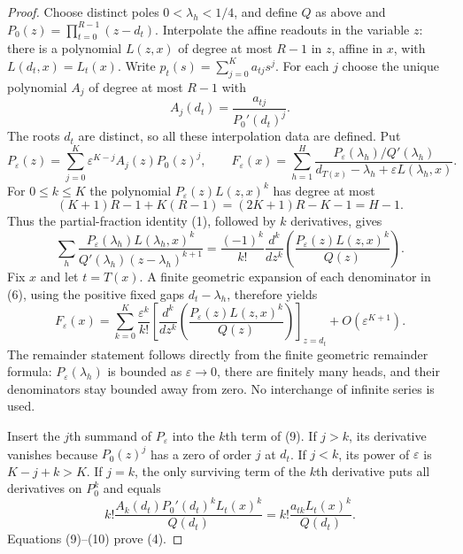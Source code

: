 \documentclass[11pt]{article}
\begin{document}
\begin{proof}
Choose distinct poles $0<\lambda_h<1/4$, and define $Q$ as above and
$P_0(z)=\prod_{t=0}^{R-1}(z-d_t)$. Interpolate the affine readouts in
the variable $z$: there is a polynomial $L(z,x)$ of degree at most
$R-1$ in $z$, affine in $x$, with $L(d_t,x)=L_t(x)$.
Write $p_t(s)=\sum_{j=0}^K a_{tj}s^j$. For each $j$ choose the unique
polynomial $A_j$ of degree at most $R-1$ with
\[
 A_j(d_t)=\frac{a_{tj}}{P_0'(d_t)^j}.
 \tag{5}
\]
The roots $d_t$ are distinct, so all these interpolation data are defined.
Put
\[
 P_\varepsilon(z)=\sum_{j=0}^K
   \varepsilon^{K-j}A_j(z)P_0(z)^j,
 \qquad
 F_\varepsilon(x)=\sum_{h=1}^H
 \frac{P_\varepsilon(\lambda_h)/Q'(\lambda_h)}
 {d_{T(x)}-\lambda_h+\varepsilon L(\lambda_h,x)}.
 \tag{6}
\]
For $0\le k\le K$ the polynomial
$P_\varepsilon(z)L(z,x)^k$ has degree at most
\[
 (K+1)R-1+K(R-1)=(2K+1)R-K-1=H-1.
 \tag{7}
\]
Thus the partial-fraction identity (1), followed by $k$ derivatives,
gives
\[
 \sum_h\frac{P_\varepsilon(\lambda_h)L(\lambda_h,x)^k}
 {Q'(\lambda_h)(z-\lambda_h)^{k+1}}
 =\frac{(-1)^k}{k!}\frac{d^k}{dz^k}
 \left(\frac{P_\varepsilon(z)L(z,x)^k}{Q(z)}\right).
 \tag{8}
\]
Fix $x$ and let $t=T(x)$. A finite geometric expansion of each
denominator in (6), using the positive fixed gaps $d_t-\lambda_h$,
therefore yields
\[
 F_\varepsilon(x)=
 \sum_{k=0}^K\frac{\varepsilon^k}{k!}
 \left[\frac{d^k}{dz^k}
 \left(\frac{P_\varepsilon(z)L(z,x)^k}{Q(z)}\right)\right]_{z=d_t}
 +O(\varepsilon^{K+1}).
 \tag{9}
\]
The remainder statement follows directly from the finite geometric
remainder formula: $P_\varepsilon(\lambda_h)$ is bounded as
$\varepsilon\to0$, there are finitely many heads, and their denominators
stay bounded away from zero. No interchange of infinite series is used.

Insert the $j$th summand of $P_\varepsilon$ into the $k$th term of (9).
If $j>k$, its derivative vanishes because $P_0(z)^j$ has a zero of
order $j$ at $d_t$. If $j<k$, its power of $\varepsilon$ is
$K-j+k>K$. If $j=k$, the only surviving term of the $k$th derivative
puts all derivatives on $P_0^k$ and equals
\[
 k!\frac{A_k(d_t)P_0'(d_t)^kL_t(x)^k}{Q(d_t)}
 =k!\frac{a_{tk}L_t(x)^k}{Q(d_t)}.
 \tag{10}
\]
Equations (9)--(10) prove (4).


\end{proof}
\end{document}
